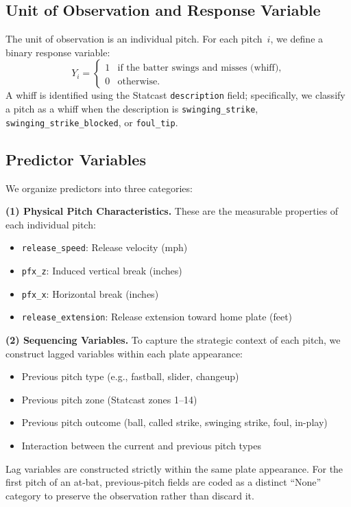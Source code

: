 \documentclass[11pt]{article}
\begin{document}
\subsection{Unit of Observation and Response Variable}

The unit of observation is an individual pitch.
For each pitch~$i$, we define a binary response variable:
\[
   Y_i =
   \begin{cases}
   1 & \text{if the batter swings and misses (whiff)}, \\
   0 & \text{otherwise}.
   \end{cases}
\]
A whiff is identified using the Statcast \texttt{description} field; specifically, we classify a pitch as a whiff when the description is \texttt{swinging\_strike}, \texttt{swinging\_strike\_blocked}, or \texttt{foul\_tip}.

\subsection{Predictor Variables}

We organize predictors into three categories:

\medskip
\noindent\textbf{(1) Physical Pitch Characteristics.}
These are the measurable properties of each individual pitch:
\begin{itemize}[nosep]
    \item \texttt{release\_speed}: Release velocity (mph)
    \item \texttt{pfx\_z}: Induced vertical break (inches)
    \item \texttt{pfx\_x}: Horizontal break (inches)
    \item \texttt{release\_extension}: Release extension toward home plate (feet)
\end{itemize}

\medskip
\noindent\textbf{(2) Sequencing Variables.}
To capture the strategic context of each pitch, we construct lagged variables within each plate appearance:
\begin{itemize}[nosep]
    \item Previous pitch type (e.g., fastball, slider, changeup)
    \item Previous pitch zone (Statcast zones 1--14)
    \item Previous pitch outcome (ball, called strike, swinging strike, foul, in-play)
    \item Interaction between the current and previous pitch types
\end{itemize}
Lag variables are constructed strictly within the same plate appearance.
For the first pitch of an at-bat, previous-pitch fields are coded as a distinct ``None'' category to preserve the observation rather than discard it.
\end{document}
